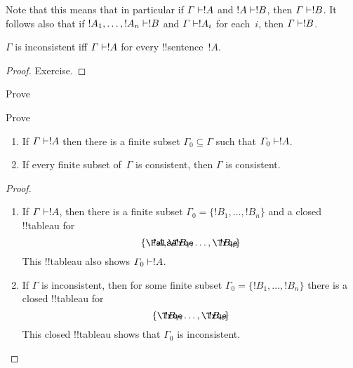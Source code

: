 \documentclass[../../../include/open-logic-section]{subfiles}
\begin{document}
Note that this means that in particular if $\Gamma \Proves !A$ and $!A
\Proves !B$, then $\Gamma \Proves !B$. It follows also that if $!A_1,
\dots, !A_n \Proves !B$ and $\Gamma \Proves !A_i$ for each~$i$, then
$\Gamma \Proves !B$.

\begin{prop}
$\Gamma$ is inconsistent iff $\Gamma \Proves !A$ for every
  !!{sentence}~$!A$.
\end{prop}

\begin{proof}
Exercise.
\end{proof}

\begin{prob}
Prove 
\end{prob}
\tagendprob

\begin{prob}
Prove 
\end{prob}
\tagendprob

\begin{prop}[Compactness]
  \begin{enumerate}
  \item If $\Gamma \Proves !A$ then there is a finite subset $\Gamma_0
    \subseteq \Gamma$ such that $\Gamma_0 \Proves !A$.
  \item If every finite subset of~$\Gamma$ is
    consistent, then $\Gamma$ is consistent.
  \end{enumerate}
\end{prop}

\begin{proof}
  \begin{enumerate}
    \item If $\Gamma \Proves !A$, then there is a finite subset
      $\Gamma_0 = \{!B_1, \dots, !B_n\}$ and a closed !!{tableau} for
      \[
      \{\sFmla{\False}{!A}, \sFmla{\True}{!B_1}, \dots, \sFmla{\True}{!B_n}\}
      \]
      This !!{tableau} also shows $\Gamma_0 \Proves !A$.
    \item If $\Gamma$ is inconsistent, then for some finite subset
      $\Gamma_0 = \{!B_1, \dots, !B_n\}$ there is a closed !!{tableau}
      for
      \[
      \{\sFmla{\True}{!B_1}, \dots, \sFmla{\True}{!B_n}\}
      \]
      This closed !!{tableau} shows that $\Gamma_0$ is inconsistent.
  \end{enumerate}
\end{proof}
\end{document}
